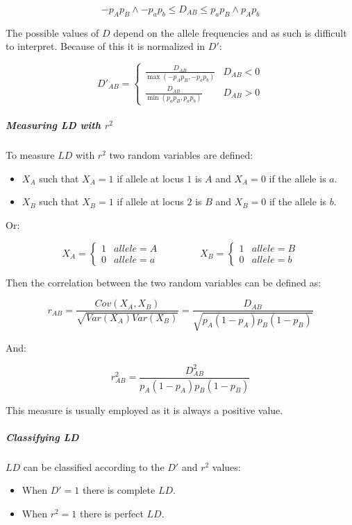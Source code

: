 			$$-p_Ap_B\land -p_ap_b\le D_{AB}\le p_ap_B\land p_Ap_b$$

			The possible values of $D$ depend on the allele frequencies and as such is difficult to interpret.
			Because of this it is normalized in $D'$:

			$$D'_{AB} = \begin{cases}\frac{D_{AB}}{\max(-p_Ap_B, -p_ap_b)} & D_{AB} < 0\\\frac{D_{AB}}{\min(p_ap_B, p_ap_b)} & D_{AB}>0\end{cases}$$

				\subparagraph{Measuring LD with $r^2$}
				To measure $LD$ with $r^2$ two random variables are defined:

				\begin{multicols}{2}
					\begin{itemize}
						\item $X_A$ such that $X_A=1$ if allele at locus $1$ is $A$ and $X_A=0$ if the allele is $a$.
						\item $X_B$ such that $X_B=1$ if allele at locus $2$ is $B$ and $X_B=0$ if the allele is $b$.
					\end{itemize}
				\end{multicols}

				Or:

				$$X_A = \begin{cases}1 & allele=A\\0 & allele = a\end{cases}\qquad\qquad X_B = \begin{cases}1 & allele = B\\0 & allele = b\end{cases}$$

				Then the correlation between the two random variables can be defined as:

				$$r_{AB} = \frac{Cov(X_A, X_B)}{\sqrt{Var(X_A)Var(X_B)}} = \frac{D_{AB}}{\sqrt{p_A(1-p_A)p_B(1-p_B)}}$$

				And:

				$$r^2_{AB} = \frac{D^2_{AB}}{p_A(1-p_A)p_B(1-p_B)}$$

				This measure is usually employed as it is always a positive value.

				\subparagraph{Classifying LD}
				$LD$ can be classified according to the $D'$ and $r^2$ values:

				\begin{multicols}{2}
					\begin{itemize}
						\item When $D'= 1$ there is complete $LD$.
						\item When $r^2 = 1$ there is perfect $LD$.
					\end{itemize}
				\end{multicols}

